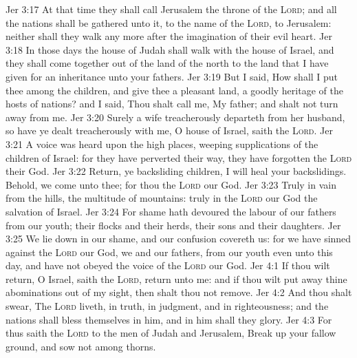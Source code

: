 \vs Jer 3:17 At that time they shall call Jerusalem the throne of the \textsc{Lord}; and all the nations shall be gathered unto it, to the name of the \textsc{Lord}, to Jerusalem: neither shall they walk any more after the imagination of their evil heart.
\vs Jer 3:18 In those days the house of Judah shall walk with the house of Israel, and they shall come together out of the land of the north to the land that I have given for an inheritance unto your fathers.
\vs Jer 3:19 But I said, How shall I put thee among the children, and give thee a pleasant land, a goodly heritage of the hosts of nations? and I said, Thou shalt call me, My father; and shalt not turn away from me.
\vs Jer 3:20 Surely  a wife treacherously departeth from her husband, so have ye dealt treacherously with me, O house of Israel, saith the \textsc{Lord}.
\vs Jer 3:21 A voice was heard upon the high places, weeping  supplications of the children of Israel: for they have perverted their way,  they have forgotten the \textsc{Lord} their God.
\vs Jer 3:22 Return, ye backsliding children,  I will heal your backslidings. Behold, we come unto thee; for thou  the \textsc{Lord} our God.
\vs Jer 3:23 Truly in vain  from the hills,  the multitude of mountains: truly in the \textsc{Lord} our God  the salvation of Israel.
\vs Jer 3:24 For shame hath devoured the labour of our fathers from our youth; their flocks and their herds, their sons and their daughters.
\vs Jer 3:25 We lie down in our shame, and our confusion covereth us: for we have sinned against the \textsc{Lord} our God, we and our fathers, from our youth even unto this day, and have not obeyed the voice of the \textsc{Lord} our God.
\vs Jer 4:1 If thou wilt return, O Israel, saith the \textsc{Lord}, return unto me: and if thou wilt put away thine abominations out of my sight, then shalt thou not remove.
\vs Jer 4:2 And thou shalt swear, The \textsc{Lord} liveth, in truth, in judgment, and in righteousness; and the nations shall bless themselves in him, and in him shall they glory.
\vs Jer 4:3 For thus saith the \textsc{Lord} to the men of Judah and Jerusalem, Break up your fallow ground, and sow not among thorns.

